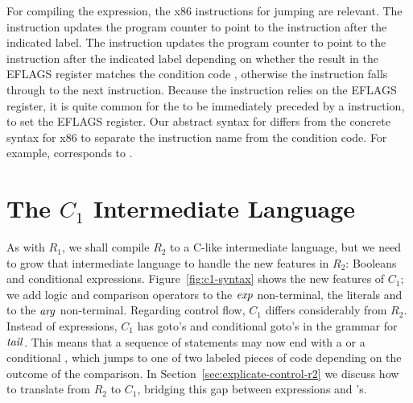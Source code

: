 \documentclass[11pt]{book}
\begin{document}
For compiling the  expression, the x86 instructions for
jumping are relevant. The  instruction updates the program
counter to point to the instruction after the indicated label.  The
 instruction updates the program counter to point to the
instruction after the indicated label depending on whether the result
in the EFLAGS register matches the condition code , otherwise
the  instruction falls through to the next
instruction. Because the  instruction relies on the EFLAGS
register, it is quite common for the  to be immediately
preceded by a  instruction, to set the EFLAGS register.
Our abstract syntax for  differs from the concrete syntax
for x86 to separate the instruction name from the condition code. For
example,  corresponds to .


\section{The $C_1$ Intermediate Language}
\label{sec:c1}

As with $R_1$, we shall compile $R_2$ to a C-like intermediate
language, but we need to grow that intermediate language to handle the
new features in $R_2$: Booleans and conditional expressions.
Figure~\ref{fig:c1-syntax} shows the new features of $C_1$; we add
logic and comparison operators to the $\mathit{exp}$ non-terminal, the
literals  and  to the $\mathit{arg}$ non-terminal.
Regarding control flow, $C_1$ differs considerably from $R_2$.
Instead of  expressions, $C_1$ has goto's and conditional
goto's in the grammar for $\mathit{tail}$. This means that a sequence of
statements may now end with a  or a conditional
, which jumps to one of two labeled pieces of code
depending on the outcome of the comparison. In
Section~\ref{sec:explicate-control-r2} we discuss how to translate
from $R_2$ to $C_1$, bridging this gap between  expressions
and 's.
\end{document}
